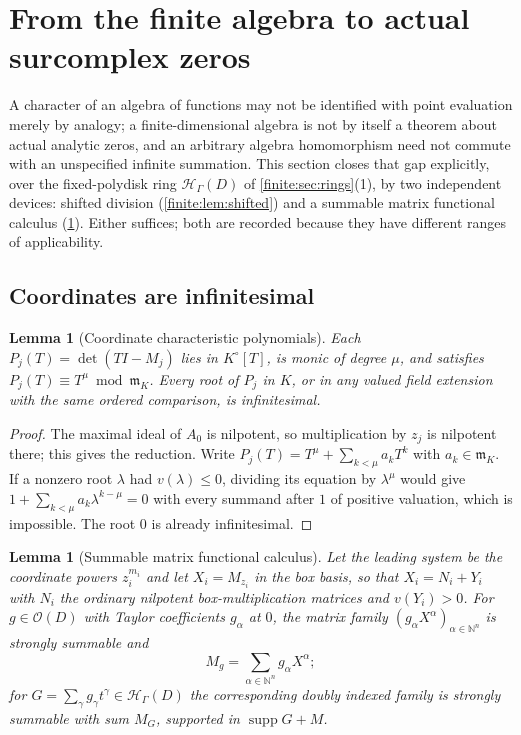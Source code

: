 \documentclass[11pt,letterpaper]{article}
\newtheorem{lemma}[theorem]{Lemma}
\theoremstyle{definition}
\theoremstyle{remark}
\newcommand{\N}{\mathbb N}
\newcommand{\OO}{\mathcal O}
\newcommand{\HH}{\mathscr H}
\newcommand{\mm}{\mathfrak m}
\newcommand{\Kc}{K^{\circ}}
\DeclareMathOperator{\supp}{supp}
\numberwithin{equation}{section}
\begin{document}
\section{From the finite algebra to actual surcomplex zeros}
\label{finite:sec:points}

A character of an algebra of functions may not be identified with point evaluation merely by analogy; a finite-dimensional algebra is not by itself a theorem about actual analytic zeros, and an arbitrary algebra homomorphism need not commute with an unspecified infinite summation. This section closes that gap explicitly, over the fixed-polydisk ring $\HH_\Gamma(D)$ of \cref{finite:sec:rings}(1), by two independent devices: shifted division (\cref{finite:lem:shifted}) and a summable matrix functional calculus (\cref{finite:lem:matrix}). Either suffices; both are recorded because they have different ranges of applicability.

\subsection{Coordinates are infinitesimal}
\label{finite:sec:infinitesimal}

\begin{lemma}[Coordinate characteristic polynomials]
\label{finite:lem:coordpoly}
Each $P_j(T)=\det(TI-M_j)$ lies in $\Kc[T]$, is monic of degree $\mu$, and satisfies $P_j(T)\equiv T^\mu \bmod\mm_K$. Every root of $P_j$ in $K$, or in any valued field extension with the same ordered comparison, is infinitesimal.
\end{lemma}

\begin{proof}
The maximal ideal of $A_0$ is nilpotent, so multiplication by $z_j$ is nilpotent there; this gives the reduction. Write $P_j(T)=T^\mu+\sum_{k<\mu}a_kT^k$ with $a_k\in\mm_K$. If a nonzero root $\lambda$ had $v(\lambda)\leq0$, dividing its equation by $\lambda^\mu$ would give $1+\sum_{k<\mu}a_k\lambda^{k-\mu}=0$ with every summand after $1$ of positive valuation, which is impossible. The root $0$ is already infinitesimal.
\end{proof}

\begin{lemma}[Summable matrix functional calculus]
\label{finite:lem:matrix}
Let the leading system be the coordinate powers $z_i^{m_i}$ and let $X_i=M_{z_i}$ in the box basis, so that $X_i=N_i+Y_i$ with $N_i$ the ordinary nilpotent box-multiplication matrices and $v(Y_i)>0$. For $g\in\OO(D)$ with Taylor coefficients $g_\alpha$ at $0$, the matrix family $(g_\alpha X^\alpha)_{\alpha\in\N^n}$ is strongly summable and
\begin{equation}\label{finite:eq:matrixcalculus}
 M_g=\sum_{\alpha\in\N^n}g_\alpha X^\alpha ;
\end{equation}
for $G=\sum_\gamma g_\gamma t^\gamma\in\HH_\Gamma(D)$ the corresponding doubly indexed family is strongly summable with sum $M_G$, supported in $\supp G+M$.
\end{lemma}
\end{document}
